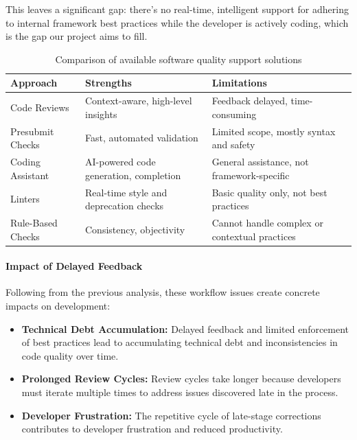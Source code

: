 \begin{spacing}{1.2}
This leaves a significant gap: there's no real-time, intelligent support for adhering to internal framework best practices while the developer is actively coding, which is the gap our project aims to fill.

\begin{table}[H]
\centering
\begin{tabular}{|p{4cm}|p{5cm}|p{5cm}|}
\hline
\textbf{Approach} & \textbf{Strengths} & \textbf{Limitations} \\
\hline
Code Reviews & Context-aware, high-level insights & Feedback delayed, time-consuming \\
\hline
Presubmit Checks & Fast, automated validation & Limited scope, mostly syntax and safety \\
\hline
Coding Assistant & AI-powered code generation, completion & General assistance, not framework-specific \\
\hline
Linters & Real-time style and deprecation checks & Basic quality only, not best practices \\
\hline
Rule-Based Checks & Consistency, objectivity & Cannot handle complex or contextual practices \\
\hline
\end{tabular}
    \caption{Comparison of available software quality support solutions}
\label{tab:extended_solutions}
\end{table}

    
\paragraph{Impact of Delayed Feedback}
Following from the previous analysis, these workflow issues create concrete impacts on development:

\begin{itemize}
    \item \textbf{Technical Debt Accumulation:} Delayed feedback and limited enforcement of best practices lead to accumulating technical debt and inconsistencies in code quality over time.
    
    \item \textbf{Prolonged Review Cycles:} Review cycles take longer because developers must iterate multiple times to address issues discovered late in the process.
    
    \item \textbf{Developer Frustration:} The repetitive cycle of late-stage corrections contributes to developer frustration and reduced productivity.
    

\end{itemize}
\end{spacing}
